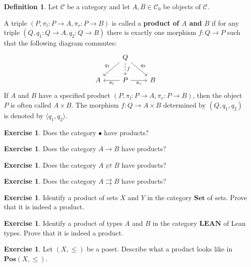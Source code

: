 \documentclass[a4paper,10pt]{scrartcl}
\theoremstyle{plain}
\theoremstyle{definition}
\newtheorem{dfn}[thm]{Definition}
\newtheorem{exer}[thm]{Exercise}
\newcommand{\Cat}[1]{\mathcal{#1}}
\newcommand{\CC}{\Cat{C}}
\newcommand{\Catb}[1]{\mathbf{#1}}
\newcommand{\SET}{\Catb{Set}}
\newcommand{\POS}{\Catb{Pos}}
\newcommand{\LEAN}{\Catb{LEAN}}
\newcommand{\Ob}[1]{{#1}_0}
\newcommand{\projl}{\ensuremath{\pi_l}}
\newcommand{\projr}{\ensuremath{\pi_r}}
\begin{document}
\begin{dfn}
  Let $\CC$ be a category and let $A,B \in \Ob\CC$ be objects of $\CC$.

  A triple $(P,\projl : P \to A ,\projr : P \to B)$ is called a \textbf{product of $A$ and $B$} if for any triple $(Q,q_1 : Q \to A, q_2 : Q \to B)$ there is exactly one morphism $f : Q \to P$ such that the following diagram commutes:
  \[
    \begin{tikzcd}
      &
      Q \ar[ld, "q_1"'] \ar[rd, "q_2"] \ar[d, dashed, "f"]
      &
      \\
      A
      &
      P \ar[l, "\projl"] \ar[r, "\projr"']
      &
      B
    \end{tikzcd}
  \]
  If $A$ and $B$ have a specified product $(P,\projl : P \to A ,\projr : P \to B)$, then the object $P$ is often called $A \times B$.
  The morphism $f : Q \to A \times B$ determined by $(Q, q_1, q_2)$ is denoted by $\langle q_1, q_2 \rangle$.
\end{dfn}



\begin{exer}
  Does the category $\bullet$ have products?
\end{exer}

\begin{exer}
  Does the category $A \to B$ have products?
\end{exer}

\begin{exer}
  Does the category $A \rightleftarrows B$ have products?
\end{exer}

\begin{exer}
  Does the category $A \rightrightarrows B$ have products?
\end{exer}


\begin{exer}
  Identify a product of sets $X$ and $Y$ in the category $\SET$ of sets.
  Prove that it is indeed a product.
\end{exer}

\begin{exer}
  Identify a product of types $A$ and $B$ in the category $\LEAN$ of Lean types.
  Prove that it is indeed a product.
\end{exer}

\begin{exer}
  Let $(X,\leq)$ be a poset. Describe what a product looks like in  $\POS(X,\leq)$.
\end{exer}
\end{document}
